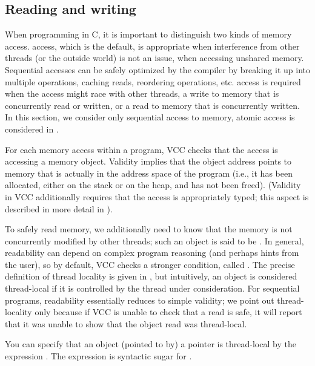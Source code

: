 \subsection{Reading and writing}
\label{sect:writes}
When programming in C, it is important to distinguish two kinds of
memory access.  access, which is the default, is appropriate when
interference from other threads (or the outside world) is not an
issue, \eg when accessing unshared memory. Sequential accesses can be
safely optimized by the compiler by breaking it up into multiple
operations, caching reads, reordering operations, etc. 
 access is required when the access might race with other
threads, \eg a write to memory that is concurrently read or written,
or a read to memory that is concurrently written. In this section, we
consider only sequential access to memory, atomic access is considered
in . 

For each memory access within a program, VCC checks that the access is accessing a 
 memory object. Validity implies that the object address
points to memory that is actually in the address space of the program
(i.e., it has been allocated, either on the stack or on the heap, and
has not been freed). (Validity in VCC additionally requires that the
access is appropriately typed; this aspect is 
described in more detail in ). 

To safely read memory, we additionally need to know that the memory
is not concurrently modified by other threads; such an object is said
to be . In general, readability can depend on complex
program reasoning (and perhaps hints from the user), so by default,
VCC checks a stronger condition, called . The precise definition of thread locality is given in 
, but intuitively, an object is
considered thread-local if it is controlled by the thread under
consideration. For sequential programs, readability essentially
reduces to simple validity; we point out thread-locality only because
if VCC is unable to check that a read is safe, it will report that it
was unable to show that the object read was thread-local.

You can specify that an object (pointed to by) a pointer  is
thread-local by the expression . 
The expression  is
syntactic sugar for .


